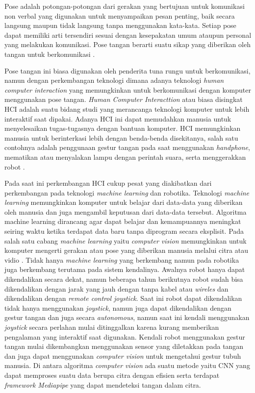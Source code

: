 Pose adalah potongan-potongan dari gerakan yang bertujuan untuk komunikasi non verbal yang digunakan untuk menyampaikan pesan penting, baik secara langsung maupun tidak langsung tanpa menggunakan kata-kata. Setiap pose dapat memiliki arti tersendiri sesuai dengan kesepakatan umum ataupun personal yang melakukan komunikasi. Pose tangan berarti suatu sikap yang diberikan oleh tangan untuk berkomunikasi \parencite{gesturtangan}. \par
Pose tangan ini biasa digunakan oleh penderita tuna rungu untuk berkomunikasi, namun dengan perkembangan teknologi dimana adanya teknologi \textit{human computer interaction} yang memungkinkan untuk berkomunikasi dengan komputer menggunakan pose tangan. \textit{Human Computer Interacttion} atau biasa disingkat HCI adalah suatu bidang studi yang merancanga teknologi komputer untuk lebih interaktif saat dipakai. Adanya HCI ini dapat memudahkan manusia untuk menyelesaikan tugas-tugasnya dengan bantuan komputer. HCI memungkinkan manusia untuk berinterkasi lebih dengan benda-benda disekitanya, salah satu contohnya adalah penggunaan gestur tangan pada saat menggunakan \textit{handphone}, mematikan atau menyalakan lampu dengan perintah suara, serta menggerakkan robot \parencite{HCI}. \par
Pada saat ini perkembangan HCI cukup pesat yang diakibatkan dari perkembangan pada teknologi \textit{machine learning} dan robotika. Teknologi \textit{machine learning} memungkinkan komputer untuk belajar dari data-data yang diberikan oleh manusia dan juga mengambil keputusan dari data-data tersebut. Algoritma machine learning dirancang agar dapat belajar dan kemampuannya meningkat seiring waktu ketika terdapat data baru tanpa diprogram secara eksplisit. Pada salah satu cabang \textit{machine learning} yaitu \textit{computer vision} memungkinkan untuk komputer mengerti gerakan atau pose yang diberikan manusia melalui citra atau vidio \parencite{Bukusakti}. Tidak hanya \textit{machine learning} yang berkembang namun pada robotika juga berkembang terutama pada sistem kendalinya. Awalnya robot hanya dapat dikendalikan secara dekat, namun beberapa tahun berikutnya robot sudah bisa dikendalikan dengan jarak yang jauh dengan tanpa kabel atau \textit{wireles} dan dikendalikan dengan \textit{remote control joystick}. Saat ini robot dapat dikendalikan tidak hanya menggunakan \textit{joystick}, namun juga dapat dikendalikan dengan gestur tangan dan juga secara  \textit{autonomous}, namun saat ini kendali menggunakan \textit{joystick} secara perlahan mulai ditinggalkan karena kurang memberikan pengalaman yang interaktif saat digunakan. 
Kendali robot menggunakan gestur tangan mulai dikembangkan menggunakan sensor yang diletakkan pada tangan dan juga dapat menggunakan \textit{computer vision} untuk mengetahui gestur tubuh manusia. Di antara algoritma \textit{computer vision} ada suatu metode yaitu CNN yang dapat memproses suatu data berupa citra dengan efisien serta terdapat \textit{framework Mediapipe} yang dapat mendeteksi tangan dalam citra. 

